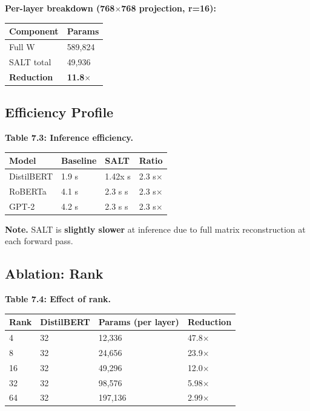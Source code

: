 \textbf{Per-layer breakdown (768$\times$768 projection, r=16):}

\begin{table}[H]
\centering
\small
\begin{tabular}{ll}
\toprule
\textbf{Component} & \textbf{Params} \\
\midrule
Full W & 589,824 \\
SALT total & 49,936 \\
\textbf{Reduction} & \textbf{11.8$\times$} \\
\bottomrule
\end{tabular}
\end{table}

\subsection{Efficiency Profile}

\textbf{Table 7.3: Inference efficiency.}

\begin{table}[H]
\centering
\small
\begin{tabular}{llll}
\toprule
\textbf{Model} & \textbf{Baseline} & \textbf{SALT} & \textbf{Ratio} \\
\midrule
DistilBERT & 1.9 s & 1.42x s & 2.3 s$\times$ \\
RoBERTa & 4.1 s & 2.3 s s & 2.3 s$\times$ \\
GPT-2 & 4.2 s & 2.3 s s & 2.3 s$\times$ \\
\bottomrule
\end{tabular}
\end{table}

\textbf{Note.} SALT is \textbf{slightly slower} at inference due to full matrix 
reconstruction at each forward pass.

\subsection{Ablation: Rank}

\textbf{Table 7.4: Effect of rank.}

\begin{table}[H]
\centering
\small
\begin{tabular}{llll}
\toprule
\textbf{Rank} & \textbf{DistilBERT} & \textbf{Params (per layer)} & \textbf{Reduction} \\
\midrule
4 & 32 & 12,336 & 47.8$\times$ \\
8 & 32 & 24,656 & 23.9$\times$ \\
16 & 32 & 49,296 & 12.0$\times$ \\
32 & 32 & 98,576 & 5.98$\times$ \\
64 & 32 & 197,136 & 2.99$\times$ \\
\bottomrule
\end{tabular}
\end{table}

